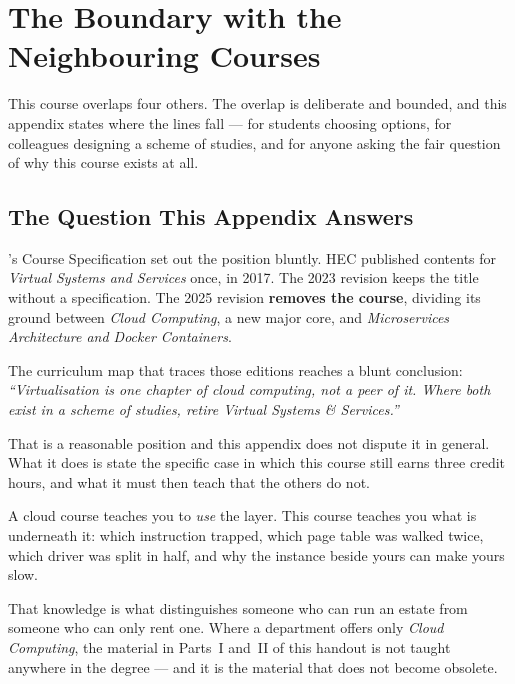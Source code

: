\chapter{The Boundary with the Neighbouring Courses}\label{app:boundary}
\normalfigures

This course overlaps four others. The overlap is deliberate and bounded, and
this appendix states where the lines fall --- for students choosing options, for
colleagues designing a scheme of studies, and for anyone asking the fair
question of why this course exists at all.

\section{The Question This Appendix Answers}

's Course Specification set out the position bluntly. HEC published
contents for \emph{Virtual Systems and Services} once, in 2017. The 2023
revision keeps the title without a specification. The 2025 revision
\textbf{removes the course}, dividing its ground between \emph{Cloud Computing},
a new major core, and \emph{Microservices Architecture and Docker Containers}.

The curriculum map that traces those editions reaches a blunt conclusion:
\emph{``Virtualisation is one chapter of cloud computing, not a peer of it.
Where both exist in a scheme of studies, retire Virtual Systems \& Services.''}

That is a reasonable position and this appendix does not dispute it in general.
What it does is state the specific case in which this course still earns three
credit hours, and what it must then teach that the others do not.

\begin{conceptbox}
A cloud course teaches you to \emph{use} the layer. This course teaches you what
is underneath it: which instruction trapped, which page table was walked twice,
which driver was split in half, and why the instance beside yours can make yours
slow.

\smallskip
That knowledge is what distinguishes someone who can run an estate from someone
who can only rent one. Where a department offers only \emph{Cloud Computing},
the material in Parts~I and~II of this handout is not taught anywhere in the
degree --- and it is the material that does not become obsolete.
\end{conceptbox}

